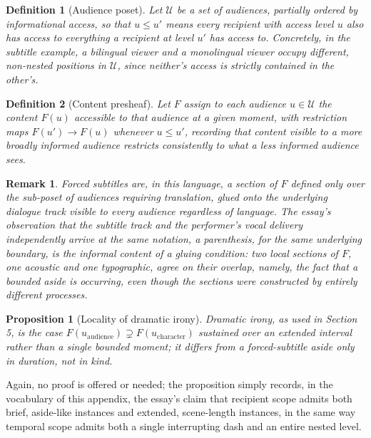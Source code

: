 \documentclass[11pt]{article}
\newtheorem{definition}{Definition}
\newtheorem{proposition}{Proposition}
\newtheorem{remark}{Remark}
\begin{document}
\begin{definition}[Audience poset]
Let $\mathcal{U}$ be a set of audiences, partially ordered by informational access, so that $u \leq u'$ means every recipient with access level $u$ also has access to everything a recipient at level $u'$ has access to. Concretely, in the subtitle example, a bilingual viewer and a monolingual viewer occupy different, non-nested positions in $\mathcal{U}$, since neither's access is strictly contained in the other's.
\end{definition}

\begin{definition}[Content presheaf]
Let $F$ assign to each audience $u \in \mathcal{U}$ the content $F(u)$ accessible to that audience at a given moment, with restriction maps $F(u') \to F(u)$ whenever $u \leq u'$, recording that content visible to a more broadly informed audience restricts consistently to what a less informed audience sees.
\end{definition}

\begin{remark}
Forced subtitles are, in this language, a section of $F$ defined only over the sub-poset of audiences requiring translation, glued onto the underlying dialogue track visible to every audience regardless of language. The essay's observation that the subtitle track and the performer's vocal delivery independently arrive at the same notation, a parenthesis, for the same underlying boundary, is the informal content of a gluing condition: two local sections of $F$, one acoustic and one typographic, agree on their overlap, namely, the fact that a bounded aside is occurring, even though the sections were constructed by entirely different processes.
\end{remark}

\begin{proposition}[Locality of dramatic irony]
Dramatic irony, as used in Section 5, is the case $F(u_{\mathrm{audience}}) \supsetneq F(u_{\mathrm{character}})$ sustained over an extended interval rather than a single bounded moment; it differs from a forced-subtitle aside only in duration, not in kind.
\end{proposition}

Again, no proof is offered or needed; the proposition simply records, in the vocabulary of this appendix, the essay's claim that recipient scope admits both brief, aside-like instances and extended, scene-length instances, in the same way temporal scope admits both a single interrupting dash and an entire nested level.
\end{document}
